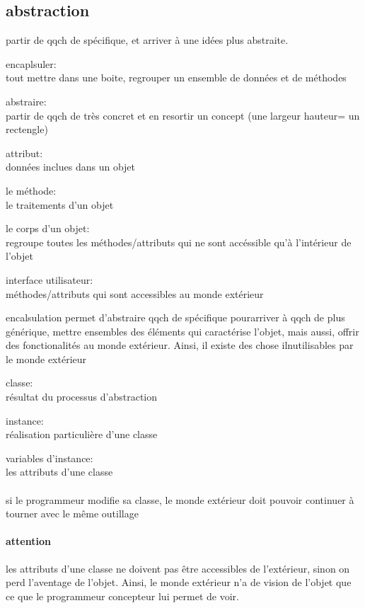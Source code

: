\documentclass[a4paper,10pt]{article}
\begin{document}
\subsection{abstraction}
partir de qqch de spécifique, et arriver à une idées plus abstraite.
\begin{description}
 \item encaplsuler:\\{tout mettre dans une boite, regrouper un ensemble de données et de méthodes}
 \item abstraire: \\{partir de qqch de très concret et en resortir un concept (une largeur hauteur= un rectengle)}
 \item attribut:\\{données inclues dans un objet}
 \item le méthode:\\{le traitements d'un objet}
 \item le corps d'un objet:\\{regroupe toutes les méthodes/attributs qui ne sont accéssible qu'à l'intérieur de l'objet}
 \item interface utilisateur:\\{méthodes/attributs qui sont accessibles au monde extérieur}
\end{description}
encalsulation permet d'abstraire qqch de spécifique pourarriver à qqch de plus générique, mettre ensembles des éléments qui caractérise
l'objet, mais aussi, offrir des fonctionalités au monde extérieur. Ainsi, il existe des chose ilnutilisables par le monde extérieur
\begin{description}
 \item classe:\\{résultat du processus d'abstraction}
 \item instance:\\{réalisation particulière d'une classe}
 \item variables d'instance:\\{les attributs d'une classe}
\end{description}
\paragraph{}
si le programmeur modifie sa classe, le monde extérieur doit pouvoir continuer à tourner avec le même outillage
\paragraph{attention}
les attributs d'une classe ne doivent pas être accessibles de l'extérieur, sinon on perd l'aventage de l'objet. Ainsi, le monde extérieur
n'a de vision de l'objet que ce que le programmeur concepteur lui permet de voir.
\end{document}
